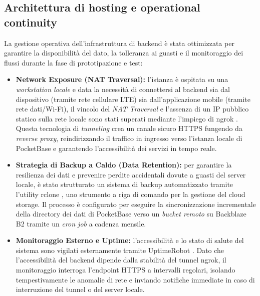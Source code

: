 \documentclass[12pt,a4paper]{article}
\begin{document}
\subsection{Architettura di hosting e operational continuity}
La gestione operativa dell'infrastruttura di backend è stata ottimizzata per garantire la disponibilità del dato, la tolleranza ai guasti e il monitoraggio dei flussi durante la fase di prototipazione e test:
\begin{itemize}
    \item \textbf{Network Exposure (NAT Traversal):} l'istanza è ospitata su una \textit{workstation locale} e data la necessità di connettersi al backend sia dal dispositivo (tramite rete cellulare LTE) sia dall'applicazione mobile (tramite rete dati/Wi-Fi), il vincolo del \textit{NAT Traversal} e l'assenza di un IP pubblico statico sulla rete locale sono stati superati mediante l'impiego di ngrok \cite{ngrok}. Questa tecnologia di \textit{tunneling} crea un canale sicuro HTTPS fungendo da \textit{reverse proxy}, reindirizzando il traffico in ingresso verso l'istanza locale di PocketBase e garantendo l'accessibilità dei servizi in tempo reale.
    \item \textbf{Strategia di Backup a Caldo (Data Retention):} per garantire la resilienza dei dati e prevenire perdite accidentali dovute a guasti del server locale, è stato strutturato un sistema di backup automatizzato tramite l'utility rclone \cite{rclone}, uno strumento a riga di comando per la gestione del cloud storage. Il processo è configurato per eseguire la sincronizzazione incrementale della directory dei dati di PocketBase verso un \textit{bucket remoto} su Backblaze B2 \cite{backblaze} tramite un \textit{cron job} a cadenza mensile.    
    \item \textbf{Monitoraggio Esterno e Uptime:} l'accessibilità e lo stato di salute del sistema sono vigilati esternamente tramite UptimeRobot \cite{uptimerobot}. Dato che l'accessibilità del backend dipende dalla stabilità del tunnel ngrok, il monitoraggio interroga l'endpoint HTTPS a intervalli regolari, isolando tempestivamente le anomalie di rete e inviando notifiche immediate in caso di interruzione del tunnel o del server locale.
\end{itemize}
\end{document}

